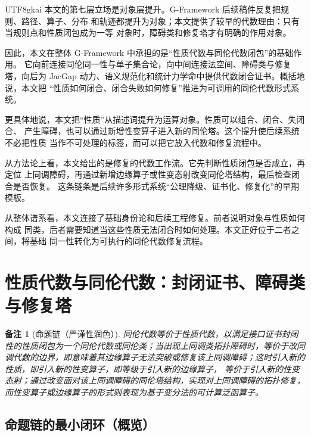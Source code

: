 \documentclass[12pt]{article}
\newtheorem{remark}{备注}[section]
\newcommand{\GFramework}{\textsf{G-Framework}}
\begin{document}
\begin{CJK*}{UTF8}{gkai}
本文的第七层立场是对象层提升。G-Framework 后续稿件反复把规则、路径、算子、分布
和轨迹都提升为对象；本文提供了较早的代数理由：只有当规则点和性质闭包成为一等
对象时，障碍类和修复塔才有明确的作用对象。

因此，本文在整体 \GFramework{} 中承担的是“性质代数与同伦代数闭包”的基础作用。
它向前连接同伦同一性与单子集合论，向中间连接法空间、障碍类与修复塔，向后为
JacGap 动力、语义规范化和统计力学命中提供代数闭合证书。概括地说，本文把
“性质如何闭合、闭合失败如何修复”推进为可调用的同伦代数形式系统。

更具体地说，本文把“性质”从描述词提升为运算对象。性质可以组合、闭合、失闭合、
产生障碍，也可以通过新增性变算子进入新的同伦塔。这个提升使后续系统不必把性质
当作不可处理的标签，而可以把它放入代数和修复流程中。

从方法论上看，本文给出的是修复的代数工作流。它先判断性质闭包是否成立，再定位
上同调障碍，再通过新增边缘算子或性变态射改变同伦塔结构，最后检查闭合是否恢复。
这条链条是后续许多形式系统“公理降级、证书化、修复化”的早期模板。

从整体谱系看，本文连接了基础身份论和后续工程修复。前者说明对象与性质如何构成
同类，后者需要知道当这些性质无法闭合时如何处理。本文正好位于二者之间，将基础
同一性转化为可执行的同伦代数修复流程。

\setcounter{tocdepth}{3}
\setcounter{secnumdepth}{3}
\tableofcontents
\clearpage

\section{性质代数与同伦代数：封闭证书、障碍类与修复塔}

\begin{remark}[命题链（严谨性润色）]
同伦代数等价于性质代数，以满足接口证书封闭性的性质闭包为一个同伦代数或同伦类；当出现上同调类拓扑障碍时，等价于改同调代数的边界，即意味着其边缘算子无法突破或修复该上同调障碍；这时引入新的性质，即引入新的性变算子，即等级于引入新的边缘算子，
  等价于引入新的性变态射；通过改变面对该上同调障碍的同伦塔结构，实现对上同调障碍的拓扑修复，而性变算子或边缘算子的形式则表现为基于变分法的可计算泛函算子。
\end{remark}

\subsection{命题链的最小闭环（概览）}
\label{subsec:tex18-minimal-loop}


\end{CJK*}
\end{document}
